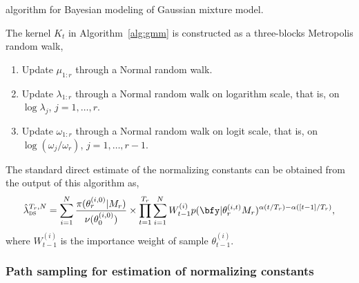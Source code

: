 \documentclass[11pt, fontset=Minion, showoverfull,
bib, mintcode, minted=cache]{marticle}
\begin{document}
\begin{algorithm}[t]
\caption{\smc algorithm for Bayesian modeling of Gaussian mixture
  model.}
\label{alg:gmm}
\end{algorithm}

The \mcmc kernel $K_t$ in Algorithm~\ref{alg:gmm} is constructed as a
three-blocks Metropolis random walk,
\begin{enumerate}
  \item Update $\mu_{1:r}$ through a Normal random walk.
  \item Update $\lambda_{1:r}$ through a Normal random walk on logarithm
    scale, that is, on $\log\lambda_{j}$, $j = 1, \dots, r$.
  \item Update $\omega_{1:r}$ through a Normal random walk on logit scale,
    that is, on $\log(\omega_{j}/\omega_r)$, $j = 1,\dots,r-1$.
\end{enumerate}

The standard direct estimate of the normalizing constants
\textcite{DelMoral:2006hc} can be obtained from the output of this \smc algorithm
as,
\begin{equation}
  \hat\lambda_{\text{\textsc{ds}}}^{T_r,N} =
  \sum_{i=1}^N \frac{\pi(\theta_r^{(i,0)}|M_r)}{\nu(\theta_0^{(i,0)})} \times
  \prod_{t=1}^{T_r} \sum_{i=1}^N W_{t-1}^{(i)}
  p(\bfy|\theta_r^{(i,t)}M_r)^{\alpha(t/T_r) - \alpha([t-1]/T_r)},
  \label{eq:smc-ds}
\end{equation}
where $W_{t-1}^{(i)}$ is the importance weight of sample $\theta_{t-1}^{(i)}$.

\subsubsection{Path sampling for estimation of normalizing constants}
\end{document}
